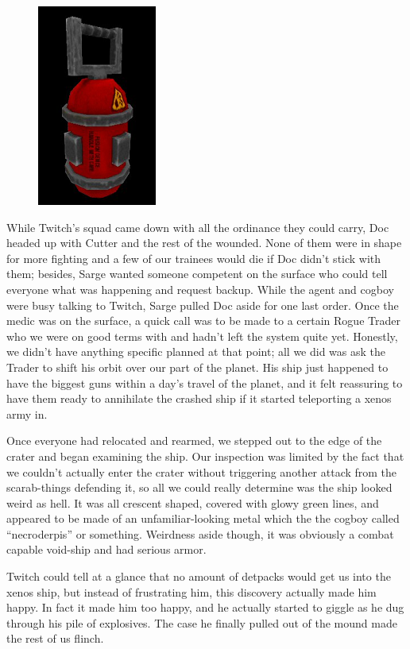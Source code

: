 \begin{figure}
	\begin{center}
		\includegraphics[width=\figwidth]{pics/8/44.png}
	\end{center}
\end{figure}
While Twitch’s squad came down with all the ordinance they could carry, Doc headed up with Cutter and the rest of the wounded. 
None of them were in shape for more fighting and a few of our trainees would die if Doc didn’t stick with them; 
besides, Sarge wanted someone competent on the surface who could tell everyone what was happening and request backup. 
While the agent and cogboy were busy talking to Twitch, Sarge pulled Doc aside for one last order. 
Once the medic was on the surface, a quick call was to be made to a certain Rogue Trader who we were on good terms with and hadn’t left the system quite yet. 
Honestly, we didn’t have anything specific planned at that point; 
all we did was ask the Trader to shift his orbit over our part of the planet. 
His ship just happened to have the biggest guns within a day’s travel of the planet, and it felt reassuring to have them ready to annihilate the crashed ship if it started teleporting a xenos army in.

Once everyone had relocated and rearmed, we stepped out to the edge of the crater and began examining the ship. 
Our inspection was limited by the fact that we couldn’t actually enter the crater without triggering another attack from the scarab-things defending it, so all we could really determine was the ship looked weird as hell. 
It was all crescent shaped, covered with glowy green lines, and appeared to be made of an unfamiliar-looking metal which the the cogboy called “necroderpis” or something. 
Weirdness aside though, it was obviously a combat capable void-ship and had serious armor. 


Twitch could tell at a glance that no amount of detpacks would get us into the xenos ship, but instead of frustrating him, this discovery actually made him happy. 
In fact it made him too happy, and he actually started to giggle as he dug through his pile of explosives. 
The case he finally pulled out of the mound made the rest of us flinch.

